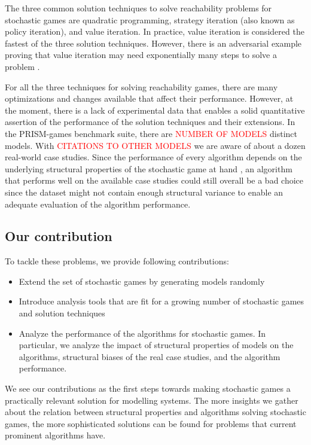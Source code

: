 The three common solution techniques to solve reachability problems for stochastic games are quadratic programming, 
strategy iteration (also known as policy iteration), and value iteration.
In practice, value iteration is considered the fastest of the three solution techniques.
However, there is an adversarial example proving that value iteration may need exponentially many steps to solve a problem \cite{viExponential}.


For all the three techniques for solving reachability games, there are many optimizations and changes available that affect their performance.
However, at the moment, there is a lack of experimental data that enables a solid quantitative assertion of the performance of the solution techniques and their extensions.
In the PRISM-games benchmark suite, there are \textcolor{red}{NUMBER OF MODELS} distinct models. 
With \textcolor{red}{CITATIONS TO OTHER MODELS} we are aware of about a dozen real-world case studies.
Since the performance of every algorithm depends on the underlying structural properties of the stochastic game at hand \cite{gandalf}, 
an algorithm that performs well on the available case studies could still overall be a bad choice since the dataset might not contain enough
structural variance to enable an adequate evaluation of the algorithm performance.

\subsection*{Our contribution}
To tackle these problems, we provide following contributions:
\begin{itemize}
    \item Extend the set of stochastic games by generating models randomly
    \item Introduce analysis tools that are fit for a growing number of stochastic games and solution techniques
    \item Analyze the performance of the algorithms for stochastic games. 
        In particular, we analyze the impact of structural properties of models on the algorithms, structural biases of the real case studies, and the algorithm performance.
\end{itemize}

We see our contributions as the first steps towards making stochastic games a practically relevant solution for modelling systems. 
The more insights we gather about the relation between structural properties and algorithms solving stochastic games, the more sophisticated 
solutions can be found for problems that current prominent algorithms have. 

